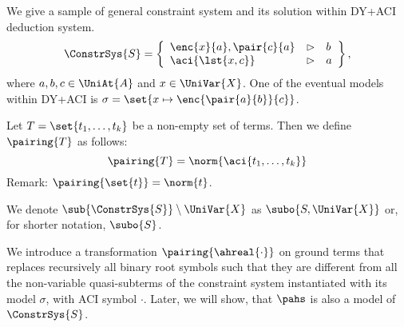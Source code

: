 \begin{example}\label{ex:constrsys}
 We give a sample of general constraint system and its solution within DY+ACI deduction system.
\[
   \ConstrSys{S}=\left\{ 
 \begin{array}{l l l}
	    { \enc{x}{a},\pair{c}{a}} & \rhd &  b \\
	    { \aci{\lst{x,c}}} & \rhd & a 
 \end{array}
  \right\},
\]  
where $a,b,c \in \UniAt{A}$ and $x \in \UniVar{X}$.
 One of the eventual models within DY+ACI is $\sigma = \set{x\mapsto \enc{\pair{a}{b}}{c}}$.
\end{example}


\begin{df}\label{def:pairing}
 Let $T=\set{t_1,\dots,t_k}$ be a non-empty set of terms. Then we define $\pairing{T}$ as follows:
 \[	
  \pairing{T} = \norm{\aci{{t_1, \dots{}, t_k}}}
 \]
Remark: $\pairing{\set{t}}=\norm{t}$.
 \end{df}

\begin{df}
We denote $\sub{\ConstrSys{S}}\setminus \UniVar{X}$ as $\subo{S,\UniVar{X}}$ or, for shorter notation, $\subo{S}$.
\end{df}


We introduce a transformation $\pairing{\ahreal{\cdot}}$ on ground terms that replaces recursively all binary root symbols such that they are different from
all the non-variable quasi-subterms of the constraint system instantiated with its model $\sigma$,  with ACI symbol $\cdot$. 
Later, we will show, that $\pahs$ is also a model of $\ConstrSys{S}$.

